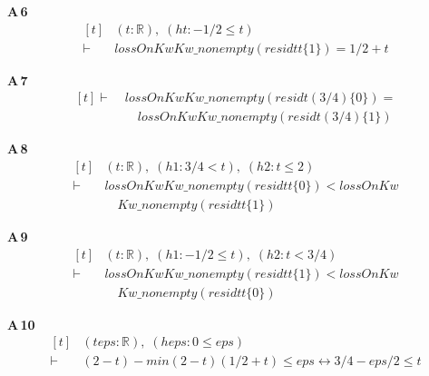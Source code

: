 \noindent\textbf{A\,6}\quad{}
{\footnotesize\[ \begin{aligned}[t]
&(\mathit{t} : \mathbb{R} ),\; (\mathit{ht} : -1 / 2 \leq \mathit{t})\\
\vdash\;&\mathit{lossOn} \mathit{Kw} \mathit{Kw\_nonempty} (\mathit{residt} \mathit{t} \{ 1\} ) = 1 / 2 + \mathit{t}
\end{aligned} \]}

\noindent\textbf{A\,7}\quad{}
{\footnotesize\[ \begin{aligned}[t]
\vdash\;&\mathit{lossOn} \mathit{Kw} \mathit{Kw\_nonempty} (\mathit{residt} (3 / 4) \{ 0\} ) =\\
&\quad \mathit{lossOn} \mathit{Kw} \mathit{Kw\_nonempty} (\mathit{residt} (3 / 4) \{ 1\} )
\end{aligned} \]}

\noindent\textbf{A\,8}\quad{}
{\footnotesize\[ \begin{aligned}[t]
&(\mathit{t} : \mathbb{R} ),\; (\mathit{h1} : 3 / 4 < \mathit{t}),\; (\mathit{h2} : \mathit{t} \leq 2)\\
\vdash\;&\mathit{lossOn} \mathit{Kw} \mathit{Kw\_nonempty} (\mathit{residt} \mathit{t} \{ 0\} ) < \mathit{lossOn} \mathit{Kw}\\
&\quad \mathit{Kw\_nonempty} (\mathit{residt} \mathit{t} \{ 1\} )
\end{aligned} \]}

\noindent\textbf{A\,9}\quad{}
{\footnotesize\[ \begin{aligned}[t]
&(\mathit{t} : \mathbb{R} ),\; (\mathit{h1} : -1 / 2 \leq \mathit{t}),\; (\mathit{h2} : \mathit{t} < 3 / 4)\\
\vdash\;&\mathit{lossOn} \mathit{Kw} \mathit{Kw\_nonempty} (\mathit{residt} \mathit{t} \{ 1\} ) < \mathit{lossOn} \mathit{Kw}\\
&\quad \mathit{Kw\_nonempty} (\mathit{residt} \mathit{t} \{ 0\} )
\end{aligned} \]}

\noindent\textbf{A\,10}\quad{}
{\footnotesize\[ \begin{aligned}[t]
&(\mathit{t} \mathit{eps} : \mathbb{R} ),\; (\mathit{heps} : 0 \leq \mathit{eps})\\
\vdash\;&(2 - \mathit{t}) - \mathit{min} (2 - \mathit{t}) (1 / 2 + \mathit{t}) \leq \mathit{eps} \leftrightarrow 3 / 4 - \mathit{eps} / 2 \leq \mathit{t}
\end{aligned} \]}

